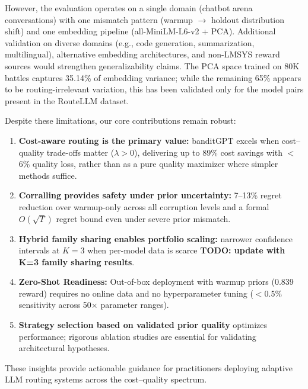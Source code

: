 However, the evaluation operates on a single domain (chatbot arena
conversations) with one mismatch pattern (warmup $\to$ holdout distribution
shift) and one embedding pipeline (all-MiniLM-L6-v2 + PCA).
Additional validation on diverse domains (e.g., code generation,
summarization, multilingual), alternative embedding architectures, and
non-LMSYS reward sources would strengthen generalizability claims.
The PCA space trained on 80K battles captures 35.14\% of embedding variance;
while the remaining 65\% appears to be routing-irrelevant variation, this has
been validated only for the model pairs present in the RouteLLM dataset.

Despite these limitations, our core contributions remain robust:
\begin{enumerate}[nosep]
    \item \textbf{Cost-aware routing is the primary value:}
    banditGPT excels when cost--quality trade-offs matter ($\lambda > 0$),
    delivering up to 89\% cost savings with $<$6\% quality loss, rather
    than as a pure quality maximizer where simpler methods suffice.
    \item \textbf{Corralling provides safety under prior uncertainty:}
    7--13\% regret reduction over warmup-only across all corruption levels
    and a formal $O(\sqrt{T})$ regret bound even under severe prior mismatch.
    \item \textbf{Hybrid family sharing enables portfolio scaling:}
    narrower confidence intervals at $K{=}3$ when per-model data is scarce
    \textbf{TODO: update with K=3 family sharing results}.
    \item \textbf{Zero-Shot Readiness:}
    Out-of-box deployment with warmup priors (0.839 reward) requires no
    online data and no hyperparameter tuning ($<$0.5\% sensitivity across
    50$\times$ parameter ranges).
    \item \textbf{Strategy selection based on validated prior quality}
    optimizes performance; rigorous ablation studies are essential for
    validating architectural hypotheses.
\end{enumerate}
These insights provide actionable guidance for practitioners deploying
adaptive LLM routing systems across the cost--quality spectrum.

